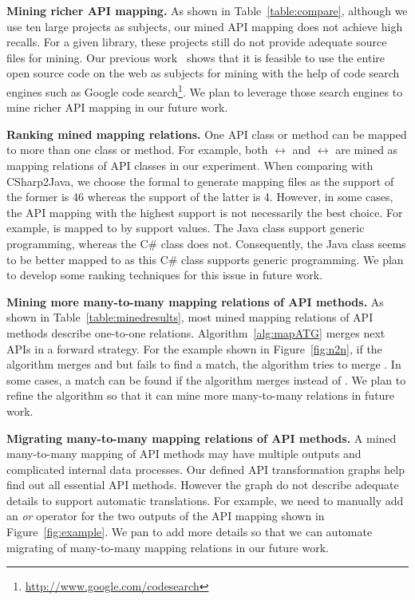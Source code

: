 \textbf{Mining richer API mapping.} As shown in
Table~\ref{table:compare}, although we use ten large projects as
subjects, our mined API mapping does not achieve high recalls. For a
given library, these projects still do not provide adequate source
files for mining. Our previous
work~\cite{thummalapenta07parseweb,thummalapentaase08spotweb} shows
that it is feasible to use the entire open source code on the web as
subjects for mining with the help of code search engines such as
Google code search\footnote{\url{http://www.google.com/codesearch}}.
We plan to leverage those search engines to mine richer API mapping
in our future work.

\textbf{Ranking mined mapping relations.} One API class or method
can be mapped to more than one class or method. For example, both
$\leftrightarrow$ 
and $\leftrightarrow$
 are mined as mapping relations of API classes
in our experiment. When comparing with CSharp2Java, we choose the
formal to generate mapping files as the support of the former is 46
whereas the support of the latter is 4. However, in some cases, the
API mapping with the highest support is not necessarily the best
choice. For example,  is mapped to
 by support values. The Java
class support generic programming, whereas the C\# class does not.
Consequently, the Java class seems to be better mapped to
 as this C\# class supports
generic programming. We plan to develop some ranking techniques for
this issue in future work.



\textbf{Mining more many-to-many mapping relations of API methods.}
As shown in Table~\ref{table:minedresults}, most mined mapping
relations of API methods describe one-to-one relations.
Algorithm~\ref{alg:mapATG} merges next APIs in a forward strategy.
For the example shown in Figure~\ref{fig:n2n}, if the algorithm
merges  and  but fails to find a
match, the algorithm tries to merge . In some
cases, a match can be found if the algorithm merges
 instead of . We plan to refine
the algorithm so that it can mine more many-to-many relations in
future work.

\textbf{Migrating many-to-many mapping relations of API methods.} A
mined many-to-many mapping of API methods may have multiple outputs
and complicated internal data processes. Our defined API
transformation graphs help find out all essential API methods.
However the graph do not describe adequate details to support
automatic translations. For example, we need to manually add an
\emph{or} operator for the two outputs of the API mapping shown in
Figure~\ref{fig:example}. We pan to add more details so that we can
automate migrating of many-to-many mapping relations in our future
work.

